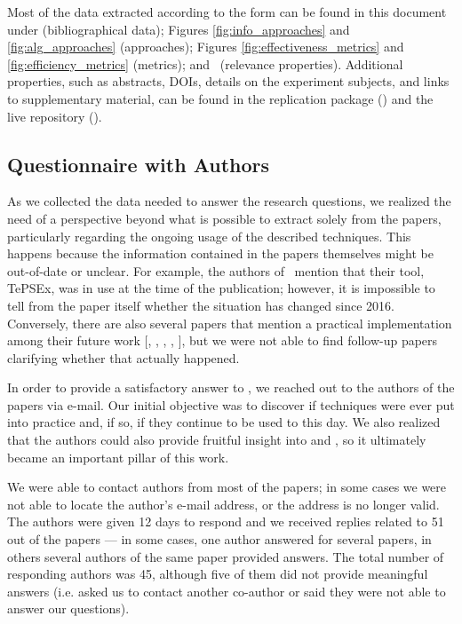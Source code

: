 Most of the data extracted according to the form can be found in this document under  (bibliographical data); Figures \ref{fig:info_approaches} and \ref{fig:alg_approaches} (approaches); Figures \ref{fig:effectiveness_metrics} and \ref{fig:efficiency_metrics} (metrics); and~ (\rea relevance properties).
Additional properties, such as abstracts, DOIs, details on the experiment subjects, and links to supplementary material, can be found in the replication package () and the live repository ().



\subsection{Questionnaire with Authors}
\label{subsec:questionnaires}

As we collected the data needed to answer the research questions, we realized the need of a perspective beyond what is possible to extract solely from the papers, particularly regarding the ongoing usage of the described techniques.
This happens because the information contained in the papers themselves might be out-of-date or unclear.
For example, the authors of~ mention that their tool, TePSEx, was in use at the time of the publication; however, it is impossible to tell from the paper itself whether the situation has changed since 2016.
Conversely, there are also several papers that mention a practical implementation among their future work [, 
, 
, 
, 
], but we were not able to find follow-up papers clarifying whether that actually happened.

In order to provide a satisfactory answer to , we reached out to the authors of the papers via e-mail.
Our initial objective was to discover if techniques were ever put into practice and, if so, if they continue to be used to this day.
We also realized that the authors could also provide fruitful insight into  and , so it ultimately became an important pillar of this work.

We were able to contact authors from most of the papers; in some cases we were not able to locate the author's e-mail address, or the address is no longer valid.
The authors were given 12 days to respond and we received replies related to 51 out of the \numpapers papers --- in some cases, one author answered for several papers, in others several authors of the same paper provided answers.
The total number of responding authors was 45, although five of them did not provide meaningful answers (i.e. asked us to contact another co-author or said they were not able to answer our questions).

